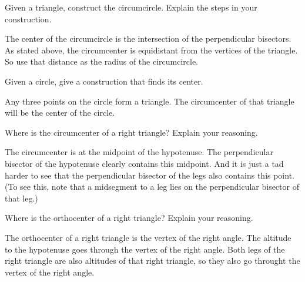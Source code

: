 \documentclass[nooutcomes]{ximera}
\begin{document}
\begin{problem}
Given a triangle, construct the circumcircle. Explain the steps
  in your construction.
\begin{freeResponse}
\begin{hint}
The center of the circumcircle is the intersection of the perpendicular bisectors.  As stated above, the circumcenter is equidistant from the vertices of the triangle.  So use that distance as the radius of the circumcircle.  
\end{hint}
\end{freeResponse}
\end{problem}

\begin{problem}
Given a circle, give a construction that finds its center. 
\begin{freeResponse}
\begin{hint}
Any three points on the circle form a triangle.  The circumcenter of that triangle will be the center of the circle.  
\end{hint}
\end{freeResponse}
\end{problem}

\begin{problem}
Where is the circumcenter of a right triangle? Explain your
  reasoning.
\begin{freeResponse}
\begin{hint}
The circumcenter is at the midpoint of the hypotenuse.  The perpendicular bisector of the hypotenuse clearly contains this midpoint.  And it is just a tad harder to see that the perpendicular bisector of the legs also contains this point.  (To see this, note that a midsegment to a leg lies on the perpendicular bisector of that leg.)
\end{hint}
\end{freeResponse}
\end{problem}

\begin{problem}
Where is the orthocenter of a right triangle? Explain your
  reasoning.
\begin{freeResponse}
\begin{hint}
The orthocenter of a right triangle is the vertex of the right angle.  The altitude to the hypotenuse goes through the vertex of the right angle.  Both legs of the right triangle are also altitudes of that right triangle, so they also go throught the vertex of the right angle.  
\end{hint}
\end{freeResponse}
\end{problem}
\end{document}

